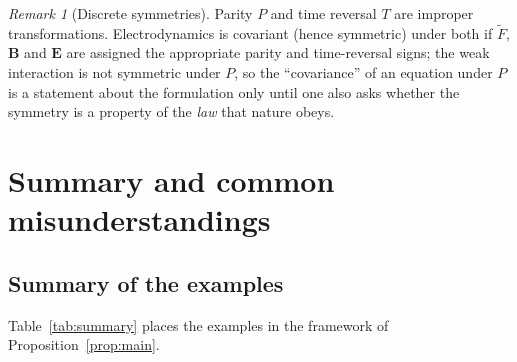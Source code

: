 \documentclass[11pt,a4paper,openany]{book}
\theoremstyle{definition}
\theoremstyle{plain}
\theoremstyle{remark}
\newtheorem{remark}{Remark}[chapter]
\newcommand{\vE}{\bm{E}}
\newcommand{\vB}{\bm{B}}
\begin{document}
\begin{remark}[Discrete symmetries]
Parity $P$ and time reversal $T$ are improper transformations. Electrodynamics
is covariant (hence symmetric) under both if $\tilde F$, $\vB$ and $\vE$ are
assigned the appropriate parity and time-reversal signs; the weak interaction
is not symmetric under $P$, so the ``covariance'' of an equation under $P$
is a statement about the formulation only until one also asks whether the
symmetry is a property of the \emph{law} that nature obeys.
\end{remark}

\section{Summary and common misunderstandings}
\label{sec:summary}

\subsection{Summary of the examples}

Table~\ref{tab:summary} places the examples in the framework of
Proposition~\ref{prop:main}.
\end{document}
